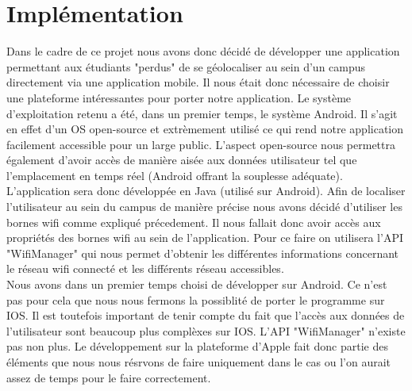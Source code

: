 \documentclass[a4paper,11pt]{article}
\begin{document}
\section{Implémentation}
  Dans le cadre de ce projet nous avons donc décidé de développer une application permettant aux étudiants "perdus" de se géolocaliser au sein d'un campus directement via une application mobile. Il nous était donc nécessaire de choisir une plateforme intéressantes pour porter notre application. Le système d'exploitation retenu a été, dans un premier temps, le système Android. Il s'agit en effet d'un OS open-source et extrèmement utilisé ce qui rend notre application facilement accessible pour un large public. L'aspect open-source nous permettra également d'avoir accès de manière aisée aux données utilisateur tel que l'emplacement en temps réel (Android offrant la souplesse adéquate).\\
L'application sera donc développée en Java (utilisé sur Android). Afin de localiser l'utilisateur au sein du campus de manière précise nous avons décidé d'utiliser les bornes wifi comme expliqué précedement. Il nous fallait donc avoir accès aux propriétés des bornes wifi au sein de l'application. Pour ce faire on utilisera l'API "WifiManager" qui nous permet d'obtenir les différentes informations concernant le réseau wifi connecté et les différents réseau accessibles.\\
Nous avons dans un premier temps choisi de développer sur Android. Ce n'est pas pour cela que nous nous fermons la possiblité de porter le programme sur IOS. Il est toutefois important de tenir compte du fait que l'accès aux données de l'utilisateur sont beaucoup plus complèxes sur IOS. L'API "WifiManager" n'existe pas non plus. Le développement sur la plateforme d'Apple fait donc partie des éléments que nous nous résrvons de faire uniquement dans le cas ou l'on aurait assez de temps pour le faire correctement.
\end{document}
